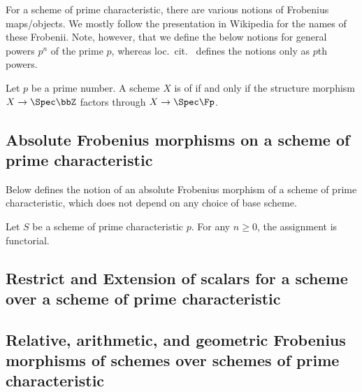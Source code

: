 For a scheme of prime characteristic, there are various notions of Frobenius maps/objects. We mostly follow the presentation in Wikipedia \cite{wiki:frobenius_endomorphisms} for the names of these Frobenii. Note, however, that we define the below notions for general powers $p^n$ of the prime $p$, whereas loc.~cit.~ defines the notions only as $p$th powers.



\begin{lemma}
    Let $p$ be a prime number. A scheme $X$ is of  if and only if the structure morphism $X \to \Spec \bbZ$ factors through $X \to \Spec \Fp$. 
\end{lemma}

\subsection{Absolute Frobenius morphisms on a scheme of prime characteristic}

Below defines the notion of an absolute Frobenius morphism of a scheme of prime characteristic, which does not depend on any choice of base scheme.





\begin{claim}
    Let $S$ be a scheme of prime characteristic $p$. For any $n \geq 0$, the assignment  is functorial.
\end{claim}

\subsection{Restrict and Extension of scalars for a scheme over a scheme of prime characteristic}



\subsection{Relative, arithmetic, and geometric Frobenius morphisms of schemes over schemes of prime characteristic}

